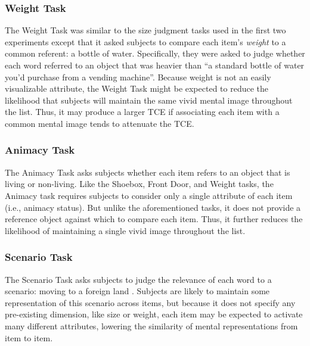 \documentclass[man,natbib,floatsintext]{apa6} %
\begin{document}
\subsubsection{Weight Task} The Weight Task was similar to the size judgment tasks used in the first two experiments except that it asked subjects to compare each item's \emph{weight} to a common referent: a bottle of water. Specifically, they were asked to judge whether each word referred to an object that was heavier than ``a standard bottle of water you'd purchase from a vending machine''. Because weight is not an easily visualizable attribute, the Weight Task might be expected to reduce the likelihood that subjects will maintain the same vivid mental image throughout the list. Thus, it may produce a larger TCE if associating each item with a common mental image tends to attenuate the TCE.

\subsubsection{Animacy Task} The Animacy Task asks subjects whether each item refers to an object that is living or non-living. Like the Shoebox, Front Door, and Weight tasks, the Animacy task requires subjects to consider only a single attribute of each item (i.e., animacy status). But unlike the aforementioned tasks, it does not provide a reference object against which to compare each item. Thus, it further reduces the likelihood of maintaining a single vivid image throughout the list. 

\subsubsection{Scenario Task} The Scenario Task asks subjects to judge the relevance of each word to a scenario: moving to a foreign land \citep{NairEtal17}. Subjects are likely to maintain some representation of this scenario across items, but because it does not specify any pre-existing dimension, like size or weight, each item may be expected to activate many different attributes, lowering the similarity of mental representations from item to item.
\end{document}
